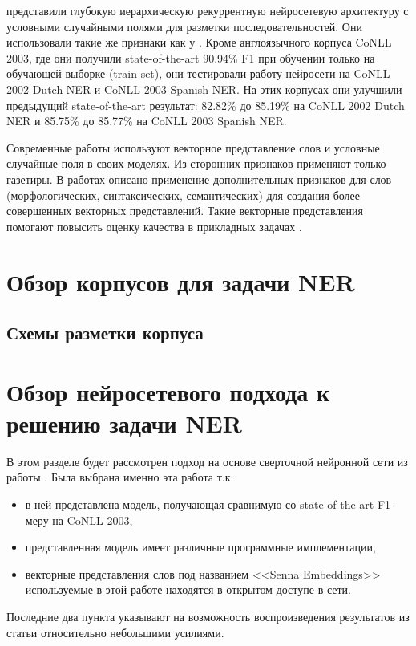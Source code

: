     \citep{DBLP:journals/corr/YangSC16} представили глубокую иерархическую рекуррентную нейросетевую
    архитектуру с условными случайными полями для разметки последовательностей.
    Они использовали такие же признаки как у \citep{collobert2011natural}.
    Кроме англоязычного корпуса CoNLL 2003, где они получили state-of-the-art 90.94\% F1 при обучении
    только на обучающей выборке (train set), они тестировали работу нейросети на CoNLL 2002 Dutch NER и CoNLL 2003 Spanish NER.
    На этих корпусах они улучшили предыдущий state-of-the-art результат:
    82.82\% до 85.19\% на CoNLL 2002 Dutch NER и 85.75\% до 85.77\% на CoNLL 2003 Spanish NER.

    Современные работы используют векторное представление слов
    и условные случайные поля в своих моделях. Из сторонних признаков применяют
    только газетиры. В работах \citep{xu2014rc, bian2014knowledge} описано применение дополнительных признаков для
    слов (морфологических, синтаксических, семантических) для создания более
    совершенных векторных представлений.
    Такие векторные представления помогают повысить оценку качества в
    прикладных задачах \citep{xu2014rc}.

  \section{Обзор корпусов для задачи NER}

  \subsection{Схемы разметки корпуса}

  \section{Обзор нейросетевого подхода к решению задачи NER}

  В этом разделе будет рассмотрен подход на основе сверточной нейронной сети из работы
  \citep{collobert2011natural}. Была выбрана именно эта работа т.к:
  \begin{itemize}
  \item в ней представлена модель, получающая сравнимую со state-of-the-art F1-меру на CoNLL 2003,
  \item представленная модель имеет различные программные имплементации,
  \item векторные представления слов под названием <<Senna Embeddings>>
    используемые в этой работе находятся в открытом доступе в сети.
  \end{itemize}
  Последние два пункта указывают на возможность воспроизведения результатов из статьи относительно небольшими усилиями.

